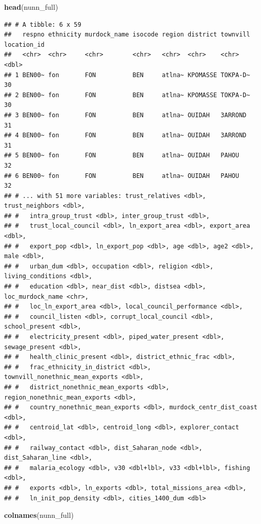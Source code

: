 \documentclass[
]{book}
\newenvironment{Shaded}{\begin{snugshade}}{\end{snugshade}}
\newcommand{\KeywordTok}[1]{\textcolor[rgb]{0.13,0.29,0.53}{\textbf{#1}}}
\newcommand{\NormalTok}[1]{#1}
\theoremstyle{definition}
\theoremstyle{definition}
\theoremstyle{definition}
\theoremstyle{remark}
\begin{document}
\begin{Shaded}
\begin{Highlighting}[]
\KeywordTok{head}\NormalTok{(nunn\_full)}
\end{Highlighting}
\end{Shaded}

\begin{verbatim}
## # A tibble: 6 x 59
##   respno ethnicity murdock_name isocode region district townvill location_id
##   <chr>  <chr>     <chr>        <chr>   <chr>  <chr>    <chr>          <dbl>
## 1 BEN00~ fon       FON          BEN     atlna~ KPOMASSE TOKPA-D~          30
## 2 BEN00~ fon       FON          BEN     atlna~ KPOMASSE TOKPA-D~          30
## 3 BEN00~ fon       FON          BEN     atlna~ OUIDAH   3ARROND           31
## 4 BEN00~ fon       FON          BEN     atlna~ OUIDAH   3ARROND           31
## 5 BEN00~ fon       FON          BEN     atlna~ OUIDAH   PAHOU             32
## 6 BEN00~ fon       FON          BEN     atlna~ OUIDAH   PAHOU             32
## # ... with 51 more variables: trust_relatives <dbl>, trust_neighbors <dbl>,
## #   intra_group_trust <dbl>, inter_group_trust <dbl>,
## #   trust_local_council <dbl>, ln_export_area <dbl>, export_area <dbl>,
## #   export_pop <dbl>, ln_export_pop <dbl>, age <dbl>, age2 <dbl>, male <dbl>,
## #   urban_dum <dbl>, occupation <dbl>, religion <dbl>, living_conditions <dbl>,
## #   education <dbl>, near_dist <dbl>, distsea <dbl>, loc_murdock_name <chr>,
## #   loc_ln_export_area <dbl>, local_council_performance <dbl>,
## #   council_listen <dbl>, corrupt_local_council <dbl>, school_present <dbl>,
## #   electricity_present <dbl>, piped_water_present <dbl>, sewage_present <dbl>,
## #   health_clinic_present <dbl>, district_ethnic_frac <dbl>,
## #   frac_ethnicity_in_district <dbl>, townvill_nonethnic_mean_exports <dbl>,
## #   district_nonethnic_mean_exports <dbl>, region_nonethnic_mean_exports <dbl>,
## #   country_nonethnic_mean_exports <dbl>, murdock_centr_dist_coast <dbl>,
## #   centroid_lat <dbl>, centroid_long <dbl>, explorer_contact <dbl>,
## #   railway_contact <dbl>, dist_Saharan_node <dbl>, dist_Saharan_line <dbl>,
## #   malaria_ecology <dbl>, v30 <dbl+lbl>, v33 <dbl+lbl>, fishing <dbl>,
## #   exports <dbl>, ln_exports <dbl>, total_missions_area <dbl>,
## #   ln_init_pop_density <dbl>, cities_1400_dum <dbl>
\end{verbatim}

\begin{Shaded}
\begin{Highlighting}[]
\KeywordTok{colnames}\NormalTok{(nunn\_full)}
\end{Highlighting}
\end{Shaded}
\end{document}
